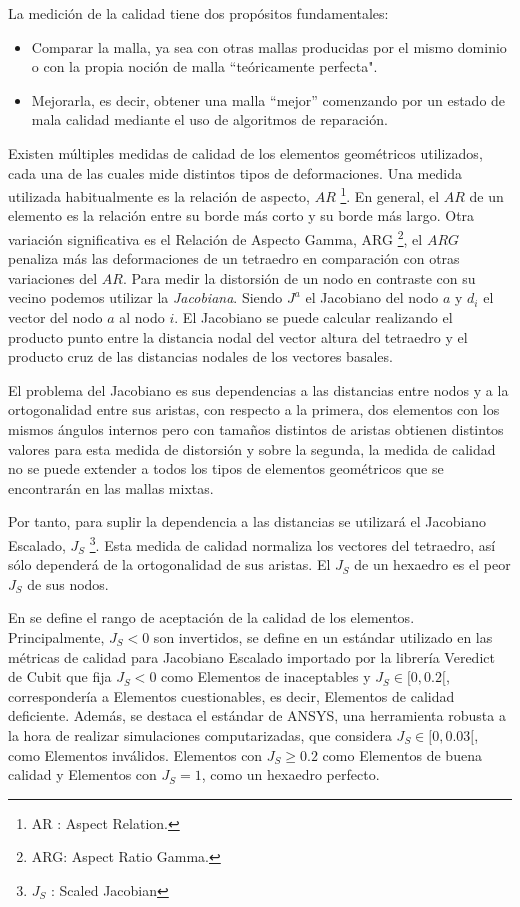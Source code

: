 La medición de la calidad tiene dos propósitos fundamentales: 

\begin{itemize}
	\item Comparar la malla, ya sea con otras mallas producidas por el mismo dominio o con la propia noción de malla ``teóricamente perfecta".
	\item Mejorarla, es decir, obtener una malla ``mejor'' comenzando por un estado de mala calidad mediante el uso de algoritmos de reparación.
\end{itemize}


Existen múltiples medidas de calidad de los elementos geométricos utilizados, cada una de las cuales mide distintos tipos de deformaciones.
Una medida utilizada habitualmente es la relación de aspecto, $AR$ \footnote{ AR : Aspect Relation.}. En general, el $AR$ de un elemento es la relación entre su borde más corto y su borde más largo. Otra variación significativa es el Relación de Aspecto Gamma, ARG \footnote{ARG: Aspect Ratio Gamma.}, el $ARG$ penaliza más las deformaciones de un tetraedro en comparación con otras variaciones del $AR$.
Para medir la distorsión de un nodo en contraste con su vecino podemos utilizar la \textit{Jacobiana}. Siendo $J^a$ el Jacobiano del nodo $a$ y $d_i$ el vector del nodo $a$ al nodo $i$. El Jacobiano se puede calcular realizando el producto punto entre la distancia nodal del vector altura del tetraedro y el producto cruz de las distancias nodales de los vectores basales.

El problema del Jacobiano es sus dependencias a las distancias entre nodos y a la ortogonalidad entre sus aristas, con respecto a la primera, dos elementos con los mismos ángulos internos pero con tamaños distintos de aristas obtienen distintos valores para esta medida de distorsión y sobre la segunda, la medida de calidad no se puede extender a todos los tipos de elementos geométricos que se encontrarán en las mallas mixtas.

Por tanto, para suplir la dependencia a las distancias se utilizará el Jacobiano Escalado, $J_S$ \footnote{$J_S$ : Scaled Jacobian}.
Esta medida de calidad normaliza los vectores del tetraedro, así sólo dependerá de la ortogonalidad de sus aristas.
El $J_S$ de un hexaedro es el peor $J_S$ de sus nodos. 

En \cite{daines2018repairing} se define el rango de aceptación de la calidad de los elementos. Principalmente, $J_S < 0$ son \elements{} invertidos, se define en \cite{shepherd-2008} un estándar utilizado en las métricas de calidad para Jacobiano Escalado importado por la librería Veredict de Cubit \cite{verdict} que fija $J_S < 0$ como Elementos de inaceptables y $J_{S} \in [0, 0.2[$, correspondería a Elementos cuestionables, es decir, Elementos de calidad deficiente. Además, se destaca el estándar de ANSYS, una herramienta robusta a la hora de realizar simulaciones computarizadas, que considera $J_{S} \in [0, 0.03[$, como Elementos inválidos. Elementos con $J_S \geq 0.2$ como Elementos de buena calidad y Elementos con $J_{S} = 1$, como un hexaedro perfecto.

